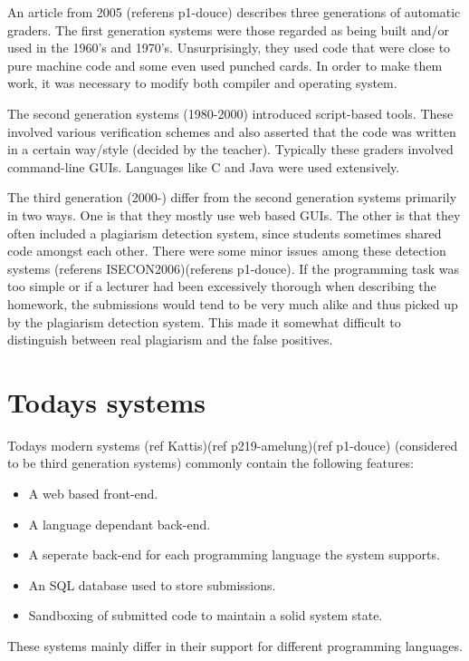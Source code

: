 An article from 2005 (referens p1-douce) describes three generations of automatic graders. The first generation systems were those regarded as being built and/or used in the 1960's and 1970's. Unsurprisingly, they used code that were close to pure machine code and some even used punched cards. In order to make them work, it was necessary to modify both compiler and operating system. 

The second generation systems (1980-2000) introduced script-based tools. These involved various verification schemes and also asserted that the code was written in a certain way/style (decided by the teacher). Typically these graders involved command-line GUIs. Languages like C and Java were used extensively.

The third generation (2000-) differ from the second generation systems primarily in two ways. One is that they mostly use web based GUIs. The other is that they often included a plagiarism detection system, since students sometimes shared code amongst each other. There were some minor issues among these detection systems (referens ISECON2006)(referens p1-douce). If the programming task was too simple or if a lecturer had been excessively thorough when describing the homework, the submissions would tend to be very much alike and thus picked up by the plagiarism detection system. This made it somewhat difficult to distinguish between real plagiarism and the false positives. 


\section{Todays systems}
Todays modern systems (ref Kattis)(ref p219-amelung)(ref p1-douce) (considered to be third generation systems) commonly contain the following features:
\begin{itemize}
	\item A web based front-end.
	\item A language dependant back-end.
	\item A seperate back-end for each programming language the system supports.
	\item An SQL database used to store submissions.
	\item Sandboxing of submitted code to maintain a solid system state. 
\end{itemize}
These systems mainly differ in their support for different programming languages.
